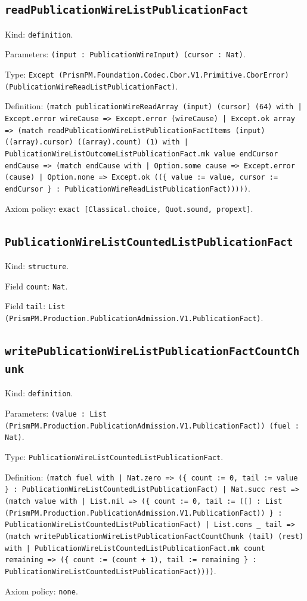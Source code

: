 \documentclass[11pt]{article}
\begin{document}
\subsection*{\texttt{readPublicationWireListPublicationFact}}
\noindent Kind: \texttt{definition}.\par
\noindent Parameters: \texttt{(input : PublicationWireInput) (cursor : Nat)}.\par
\noindent Type: \texttt{Except (PrismPM.Foundation.Codec.Cbor.V1.Primitive.CborError) (PublicationWireReadListPublicationFact)}.\par
\noindent Definition: \texttt{(match publicationWireReadArray (input) (cursor) (64) with | Except.error wireCause => Except.error (wireCause) | Except.ok array => (match readPublicationWireListPublicationFactItems (input) ((array).cursor) ((array).count) (1) with | PublicationWireListOutcomeListPublicationFact.mk value endCursor endCause => (match endCause with | Option.some cause => Except.error (cause) | Option.none => Except.ok ((\{ value := value, cursor := endCursor \} : PublicationWireReadListPublicationFact)))))}.\par
\noindent Axiom policy: \texttt{exact [Classical.choice, Quot.sound, propext]}.\par
\subsection*{\texttt{PublicationWireListCountedListPublicationFact}}
\noindent Kind: \texttt{structure}.\par
\noindent Field \texttt{count}: \texttt{Nat}.\par
\noindent Field \texttt{tail}: \texttt{List (PrismPM.Production.PublicationAdmission.V1.PublicationFact)}.\par
\subsection*{\texttt{writePublicationWireListPublicationFactCountChunk}}
\noindent Kind: \texttt{definition}.\par
\noindent Parameters: \texttt{(value : List (PrismPM.Production.PublicationAdmission.V1.PublicationFact)) (fuel : Nat)}.\par
\noindent Type: \texttt{PublicationWireListCountedListPublicationFact}.\par
\noindent Definition: \texttt{(match fuel with | Nat.zero => (\{ count := 0, tail := value \} : PublicationWireListCountedListPublicationFact) | Nat.succ rest => (match value with | List.nil => (\{ count := 0, tail := ([] : List (PrismPM.Production.PublicationAdmission.V1.PublicationFact)) \} : PublicationWireListCountedListPublicationFact) | List.cons \_ tail => (match writePublicationWireListPublicationFactCountChunk (tail) (rest) with | PublicationWireListCountedListPublicationFact.mk count remaining => (\{ count := (count + 1), tail := remaining \} : PublicationWireListCountedListPublicationFact))))}.\par
\noindent Axiom policy: \texttt{none}.\par
\end{document}

